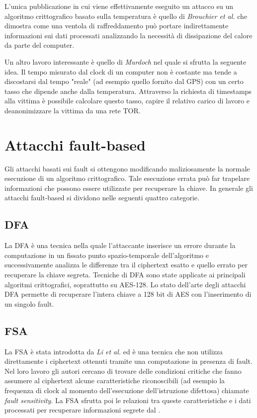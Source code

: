 		L'unica pubblicazione in cui viene effettivamente eseguito un attacco su un algoritmo crittografico basato sulla temperatura è quello di \emph{Brouchier et al.}\cite{brouchier2009temperature} che dimostra come una ventola di raffreddamento può portare indirettamente informazioni sui dati processati analizzando la necessità di dissipazione del calore da parte del computer.
		
		Un altro lavoro interessante è quello di \emph{Murdoch}\cite{murdoch2006hot} nel quale si sfrutta la seguente idea. Il tempo misurato dal clock di un computer non è costante ma tende a discostarsi dal tempo "reale" (ad esempio quello fornito dal \acs{GPS}) con un certo tasso che dipende anche dalla temperatura\cite{buracchi2015tri}. Attraverso la richiesta di timestamps alla vittima è possibile calcolare questo tasso, capire il relativo carico di lavoro e deanonimizzare la vittima da una rete \acs{TOR}.
		
	\section{Attacchi fault-based}
		Gli attacchi basati sui fault si ottengono modificando maliziosamente la normale esecuzione di un algoritmo crittografico. Tale esecuzione errata può far trapelare informazioni che possono essere utilizzate per recuperare la chiave. In generale gli attacchi fault-based si dividono nelle seguenti quattro categorie\cite{patranabis2018fault}.
		
		\subsection*{\ac{DFA}}
			La \ac{DFA} è una tecnica nella quale l'attaccante inserisce un errore durante la computazione in un fissato punto spazio-temporale dell'algoritmo e successivamente analizza le differenze tra il ciphertext esatto e quello errato per recuperare la chiave segreta. Tecniche di \ac{DFA} sono state applicate ai principali algoritmi crittografici, soprattutto su \ac{AES}-128. Lo stato dell'arte degli attacchi \ac{DFA} permette di recuperare l'intera chiave a 128 bit di \ac{AES} con l'inserimento di un singolo fault\cite{tunstall2011differential}.
			
		\subsection*{\ac{FSA}}
			La \ac{FSA} è stata introdotta da \emph{Li et al.}\cite{li2010fault} ed è una tecnica che non utilizza direttamente i ciphertext ottenuti tramite una computazione in presenza di fault. Nel loro lavoro gli autori cercano di trovare delle condizioni critiche che fanno assumere al ciphertext alcune caratteristiche riconoscibili (ad esempio la frequenza di clock al momento dell'esecuzione dell'istruzione difettosa) chiamate \emph{fault sensitivity}. La \ac{FSA} sfrutta poi le relazioni tra queste caratteristiche e i dati processati per recuperare informazioni segrete dal \disps.
			
